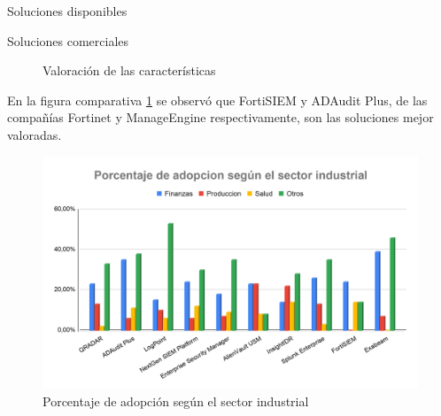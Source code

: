 \begin{section}{Soluciones disponibles}
\begin{subsection}{Soluciones comerciales}
\begin{figure}
            \caption{Valoración de las características}
            \label{fig:tabla_valoracion}
        \end{figure}
        \FloatBarrier
        En la figura comparativa \ref{fig:tabla_valoracion} se observó que FortiSIEM y ADAudit Plus, de las compañías Fortinet\cite{fortisiem} y ManageEngine\cite{adaudit} respectivamente, son las soluciones mejor valoradas.
        \begin{figure}[H]
        \centering
        \includegraphics[width=1\textwidth]{./marco_teorico_imagenes/figura_10_porcentaje_sector_ind.png}
        \caption{Porcentaje de adopción según el sector industrial}
        \label{fig:sector_industrial}
        \end{figure}
        \FloatBarrier
       

\end{subsection}
\end{section}
